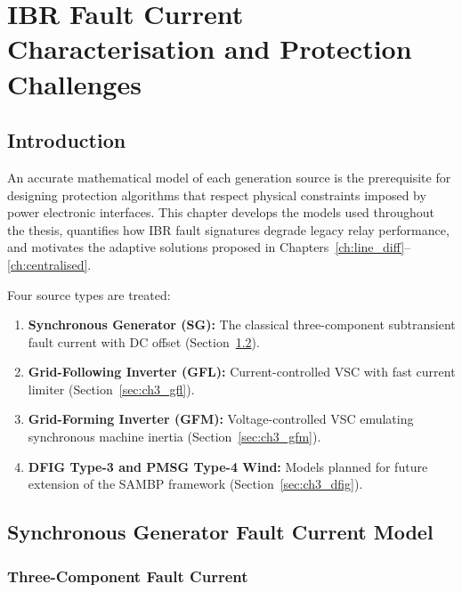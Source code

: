 \chapter{IBR Fault Current Characterisation and Protection Challenges}
\label{ch:ibr_char}

\section{Introduction}
\label{sec:ch3_intro}

An accurate mathematical model of each generation source is the prerequisite
for designing protection algorithms that respect physical constraints imposed
by power electronic interfaces. This chapter develops the models used throughout
the thesis, quantifies how IBR fault signatures degrade legacy relay performance,
and motivates the adaptive solutions proposed in Chapters~\ref{ch:line_diff}--\ref{ch:centralised}.

Four source types are treated:
\begin{enumerate}
\item \textbf{Synchronous Generator (SG):} The classical three-component
      subtransient fault current with DC offset (Section~\ref{sec:ch3_sg}).
\item \textbf{Grid-Following Inverter (GFL):} Current-controlled VSC with
      fast current limiter (Section~\ref{sec:ch3_gfl}).
\item \textbf{Grid-Forming Inverter (GFM):} Voltage-controlled VSC emulating
      synchronous machine inertia (Section~\ref{sec:ch3_gfm}).
\item \textbf{DFIG Type-3 and PMSG Type-4 Wind:} Models planned for future
      extension of the SAMBP framework (Section~\ref{sec:ch3_dfig}).
\end{enumerate}

\section{Synchronous Generator Fault Current Model}
\label{sec:ch3_sg}

\subsection{Three-Component Fault Current}

